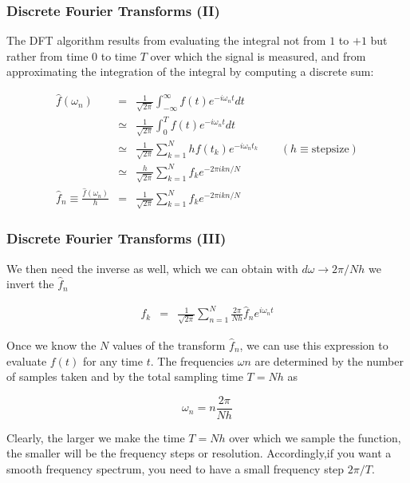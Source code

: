 \documentclass[hyperref={colorlinks=true}]{beamer}
\begin{document}
\begin{frame}%
  \frametitle{Discrete Fourier Transforms (II)}

  The DFT algorithm results from evaluating the integral not from $1$ to $+1$ but rather from time $0$ to time $T$ over which the signal is measured, and from approximating the integration of the integral by computing a discrete sum:
  
  \begin{eqnarray}
    \hat{f}(\omega_n) &=& \frac{1}{\sqrt{2\pi}} \int_{-\infty}^{\infty} f(t)   e^{-i\omega_n t}   dt \\
                 &\simeq& \frac{1}{\sqrt{2\pi}} \int_{0}^{T}            f(t)   e^{-i\omega_n t}   dt \\
                 &\simeq& \frac{1}{\sqrt{2\pi}} \sum_{k=1}^{N}        h f(t_k) e^{-i\omega_n t_k} \qquad (h\equiv\mathrm{stepsize}) \\
                 &\simeq& \frac{h}{\sqrt{2\pi}} \sum_{k=1}^{N}          f_k    e^{-2\pi i k n/N}     \\
    \hat{f}_n \equiv \frac{\hat{f}(\omega_n)}{h} &=& \frac{1}{\sqrt{2\pi}} \sum_{k=1}^{N}  f_k  e^{-2\pi i k n/N}  
  \end{eqnarray}
  
\end{frame}


\begin{frame}%
  \frametitle{Discrete Fourier Transforms (III)}

  We then need the inverse as well, which we can obtain with $d\omega \rightarrow 2\pi/Nh $ we invert the $\hat{f}_n $
      
  \begin{eqnarray}
    f_k &=& \frac{1}{\sqrt{2\pi}} \sum_{n=1}^{N} \frac{2\pi}{Nh}  \hat{f}_n  e^{i\omega_n t}  
  \end{eqnarray}
  
  Once we know the $N$ values of the transform $\hat{f}_n$, we can use this expression to evaluate $f(t)$ for any time $t$. The frequencies $\omega n$ are determined by the number of samples taken and by the total sampling time $T = N h$ as
  
  \begin{equation}
    \omega_n = n\frac{2\pi}{Nh}
  \end{equation}
  
  Clearly, the larger we make the time $T = Nh$ over which we sample the function, the smaller will be the frequency steps or resolution. Accordingly,if you want a smooth frequency spectrum, you need to have a small frequency step $2\pi/T$.
  
\end{frame}
\end{document}

